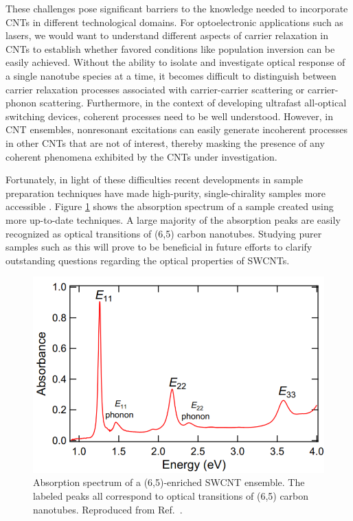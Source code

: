 These challenges pose significant barriers to the knowledge needed to incorporate CNTs in different technological domains. For optoelectronic applications such as lasers, we would want to understand different aspects of carrier relaxation in CNTs to establish whether favored conditions like population inversion can be easily achieved. Without the ability to isolate and investigate optical response of a single nanotube species at a time, it becomes difficult to distinguish between carrier relaxation processes associated with carrier-carrier scattering or carrier-phonon scattering. Furthermore, in the context of developing ultrafast all-optical switching devices, coherent processes need to be well understood. However, in CNT ensembles, nonresonant excitations can easily generate incoherent processes in other CNTs that are not of interest, thereby masking the presence of any coherent phenomena exhibited by the CNTs under investigation.

Fortunately, in light of these difficulties recent developments in sample preparation techniques have made high-purity, single-chirality samples more accessible \cite{komatsu2010comprehensive,liu2011large, janas2018towards, ichinose2017extraction, zheng2019sorting}. Figure \ref{fig:abs_fumiya} shows the absorption spectrum of a sample created using more up-to-date techniques. A large majority of the absorption peaks are easily recognized as optical transitions of (6,5) carbon nanotubes. Studying purer samples such as this will prove to be beneficial in future efforts to clarify outstanding questions regarding the optical properties of SWCNTs.

\begin{figure}
	\centering
	\includegraphics[scale=0.6]{images/chapter_intro/abs_fumiya}
	\caption{Absorption spectrum of a (6,5)-enriched SWCNT ensemble. The labeled peaks all correspond to optical transitions of (6,5) carbon nanotubes. Reproduced from Ref.\ \cite{katsutani2019direct}.}
	\label{fig:abs_fumiya}
\end{figure}


